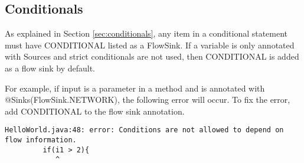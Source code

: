 \subsection{Conditionals}
As explained in Section \ref{sec:conditionals}, any item in a conditional statement must have CONDITIONAL listed as a FlowSink.  If a variable is only annotated with Sources and strict conditionals are not used, then CONDITIONAL is added as a flow sink by default. 

For example, if input is a parameter in a method and is annotated with @Sinks(FlowSink.NETWORK), the following error will occur.  To fix the error, add CONDITIONAL to the flow sink annotation.  

\begin{Verbatim}
HelloWorld.java:48: error: Conditions are not allowed to depend on flow information.
         if(i1 > 2){
            ^
\end{Verbatim}




